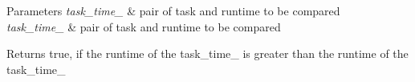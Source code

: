 \begin{DoxyParams}{Parameters}
{\em task\+\_\+time\+\_} & pair of task and runtime to be compared \\
\hline
{\em task\+\_\+time\+\_} & pair of task and runtime to be compared\\
\hline
\end{DoxyParams}
\begin{DoxyReturn}{Returns}
true, if the runtime of the task\+\_\+time\+\_ is greater than the runtime of the task\+\_\+time\+\_ 
\end{DoxyReturn}
